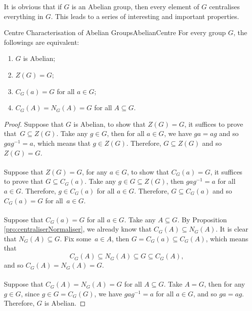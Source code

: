 \documentclass[math]{amznotes}
\theoremstyle{remark}
\newcommand{\0}{\mathbf{0}}
\newcommand{\1}{\mathbf{1}}
\begin{document}
It is obvious that if $G$ is an Abelian group, then every element of $G$ centralises everything in $G$. This leads to a series of interesting and important properties.
\begin{probox}{Centre Characterisation of Abelian Groups}{AbelianCentre}
    For every group $G$, the followings are equivalent:
    \begin{enumerate}
        \item $G$ is Abelian;
        \item $Z\left(G\right) = G$;
        \item $C_G\left(a\right) = G$ for all $a \in G$;
        \item $C_G\left(A\right) = N_G\left(A\right) = G$ for all $A \subseteq G$.
    \end{enumerate}
    \tcblower
    \begin{proof}
        Suppose that $G$ is Abelian, to show that $Z\left(G\right) = G$, it suffices to prove that~$G \subseteq Z\left(G\right)$. Take any $g \in G$, then for all $a \in G$, we have $ga = ag$ and so~$gag^{-1} = a$, which means that $g \in Z\left(G\right)$. Therefore, $G \subseteq Z\left(G\right)$ and so $Z\left(G\right) = G$. 
        \\\\
        Suppose that $Z\left(G\right) = G$, for any $a \in G$, to show that $C_G\left(a\right) = G$, it suffices to prove that $G \subseteq C_G\left(a\right)$. Take any $g \in G \subseteq Z\left(G\right)$, then $gag^{-1} = a$ for all $a \in G$. Therefore, $g \in C_G\left(a\right)$ for all $a \in G$. Therefore, $G \subseteq C_G\left(a\right)$ and so $C_G\left(a\right) = G$ for all~$a \in G$.
        \\\\
        Suppose that $C_G\left(a\right) = G$ for all $a \in G$. Take any $A \subseteq G$. By Proposition \ref{pro:centraliserNormaliser}, we already know that $C_G\left(A\right) \subseteq N_G\left(A\right)$. It is clear that $N_G\left(A\right) \subseteq G$. Fix some~$a \in A$, then $G = C_G\left(a\right) \subseteq C_G\left(A\right)$, which means that 
        \begin{equation*}
            C_G\left(A\right) \subseteq N_G\left(A\right) \subseteq G \subseteq C_G\left(A\right),
        \end{equation*}
        and so $C_G\left(A\right) = N_G\left(A\right) = G$. 
        \\\\
        Suppose that $C_G\left(A\right) = N_G\left(A\right) = G$ for all $A \subseteq G$. Take $A = G$, then for any~$g \in G$, since $g \in G = C_G\left(G\right)$, we have $gag^{-1} = a$ for all $a \in G$, and so $ga = ag$. Therefore, $G$ is Abelian.
    \end{proof}
\end{probox}
\end{document}
